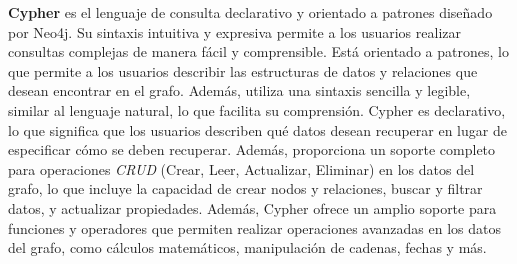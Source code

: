 \documentclass[pdflatex,sn-mathphys-num]{sn-jnl}
\theoremstyle{thmstyleone}%
\theoremstyle{thmstyletwo}%
\theoremstyle{thmstylethree}%
\begin{document}
\textbf{Cypher} es el lenguaje de consulta declarativo y orientado a patrones diseñado por Neo4j. Su sintaxis intuitiva y expresiva permite a los usuarios realizar consultas complejas de manera fácil y comprensible. Está orientado a patrones, lo que permite a los usuarios describir las estructuras de datos y relaciones que desean encontrar en el grafo. Además, utiliza una sintaxis sencilla y legible, similar al lenguaje natural, lo que facilita su comprensión. Cypher es declarativo, lo que significa que los usuarios describen qué datos desean recuperar en lugar de especificar cómo se deben recuperar. Además, proporciona un soporte completo para operaciones \textit{CRUD} (Crear, Leer, Actualizar, Eliminar) en los datos del grafo, lo que incluye la capacidad de crear nodos y relaciones, buscar y filtrar datos, y actualizar propiedades. Además, Cypher ofrece un amplio soporte para funciones y operadores que permiten realizar operaciones avanzadas en los datos del grafo, como cálculos matemáticos, manipulación de cadenas, fechas y más.
\end{document}
